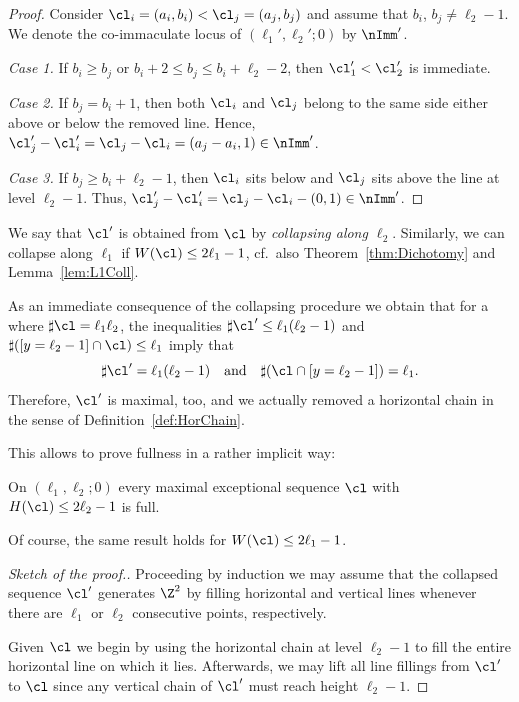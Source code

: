 \begin{proof}
Consider $\cl_i=(a_i,b_i)<\cl_j=(a_j,b_j)$ and 
assume that $b_i$, $b_j\neq\ell_2-1$. We denote 
the {co-immaculate} locus of $(\ell_1',\ell_2';0)$
by $\nImm'$.

{\em Case 1.} If $b_i\geq b_j$ or $b_i+2\leq b_j
\leq b_i+\ell_2-2$, then $\cl_1'<\cl_2'$ is 
immediate.

{\em Case 2.} If $b_j=b_i+1$, then both $\cl_i$ 
and $\cl_j$ belong to the same side either above 
or below the removed line. Hence, $\cl'_j-\cl_i'=
\cl_j-\cl_i=(a_j-a_i,1)\in\nImm'$.

{\em Case 3.} If $b_j\geq b_i+\ell_2-1$, then 
$\cl_i$ sits below and $\cl_j$ sits above the 
line at level $\ell_2-1$. Thus,
$\cl'_j-\cl_i'=\cl_j-\cl_i-(0,1)\in\nImm'$.
\end{proof}

We say that $\cl'$ is obtained from $\cl$ by 
{\em collapsing along $\ell_2$}. Similarly, we can
collapse along $\ell_1$ if $W(\cl)\leq2\ell_1-1$, 
cf.\ also Theorem~\ref{thm:Dichotomy} and
Lemma~\ref{lem:L1Coll}.

As an immediate consequence of the collapsing
procedure we obtain that
for a {\mes} where $\sharp\cl=\ell_1\ell_2$, the
inequalities $\sharp\cl'\leq \ell_1(\ell_2-1)$ and 
$\sharp([y=\ell_2-1]\cap\cl)\leq\ell_1$ imply that
$$
\sharp\cl'= \ell_1(\ell_2-1)
\quad\mbox{and}\quad
\sharp(\cl\cap[y=\ell_2-1])=\ell_1.
$$
Therefore, $\cl'$ is maximal, too, 
and we actually removed a horizontal chain in
the sense of Definition~\ref{def:HorChain}.

This allows to prove fullness in a rather 
implicit way:

\begin{coro}
\label{cor:FullnessTheoremPaPb}
On $(\ell_1,\ell_2;0)$ every maximal 
exceptional sequence $\cl$ with 
$H(\cl)\leq2\ell_2-1$ is full.
\end{coro}

Of course, the same result holds for 
$W(\cl)\leq2\ell_1-1$.

\begin{proof}[Sketch of the proof.]
Proceeding by induction we may assume 
that the collapsed sequence $\cl'$ 
generates $\Z^2$ by filling horizontal and 
vertical lines whenever there are
$\ell_1$ or $\ell_2$ consecutive points, 
respectively.

Given $\cl$ we begin by using the horizontal chain 
at level $\ell_2-1$ to fill the entire horizontal 
line on which it lies. Afterwards, we may lift all 
line fillings from $\cl'$ to $\cl$ since any vertical
chain of $\cl'$ must reach height $\ell_2-1$.
\end{proof}

